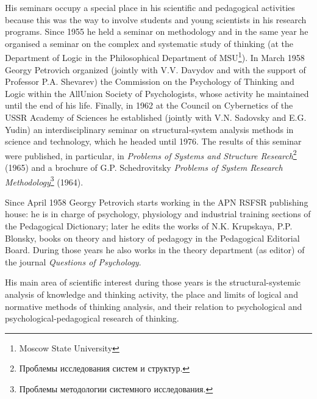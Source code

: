 \documentclass[a4paper,11pt]{article}
\begin{document}
His seminars occupy a special place in his scientific and pedagogical
activities because this was the way to involve students and young scientists
in his research programs. Since 1955 he held a seminar on methodology and in
the same year he organised a seminar on the complex and systematic study of
thinking (at the Department of Logic in the Philosophical Department of
MSU\footnote{Moscow State University}). In March 1958 Georgy Petrovich
organized (jointly with V.V. Davydov and with the support of Professor
P.A. Shevarev) the Commission on the Psychology of Thinking and Logic within
the AllUnion Society of Psychologists, whose activity he maintained until the
end of his life. Finally, in 1962 at the Council on Cybernetics of the USSR
Academy of Sciences he established (jointly with V.N. Sadovsky and E.G. Yudin)
an interdisciplinary seminar on structural-system analysis methods in science
and technology, which he headed until 1976. The results of this seminar were
published, in particular, in \emph{Problems of Systems and Structure
  Research}\footnote{\foreignlanguage{russian}{Проблемы исследования систем и
    структур.}}  (1965) and a brochure of G.P. Schedrovitsky \emph{Problems of
  System Research Methodology}\footnote{\foreignlanguage{russian}{Проблемы
    методологии системного исследования.}} (1964).

Since April 1958 Georgy Petrovich starts working in the APN RSFSR publishing
house: he is in charge of psychology, physiology and industrial training
sections of the Pedagogical Dictionary; later he edits the works of
N.K. Krupskaya, P.P. Blonsky, books on theory and history of pedagogy in the
Pedagogical Editorial Board. During those years he also works in the theory
department (as editor) of the journal \emph{Questions of Psychology}.

His main area of scientific interest during those years is the
structural-systemic analysis of knowledge and thinking activity, the place and
limits of logical and normative methods of thinking analysis, and their
relation to psychological and psychological-pedagogical research of thinking.
\end{document}
